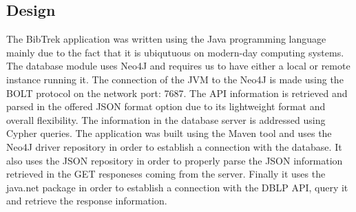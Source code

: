 \documentclass{article}
\begin{document}
\subsection{Design}
The BibTrek application was written using the Java programming language mainly due to the fact that it is ubiqutuous on modern-day computing systems. The database module uses Neo4J and requires us to have either a local or remote instance running it. The connection of the JVM to the Neo4J is made using the BOLT protocol on the network port: 7687. The API information is retrieved and parsed in the offered JSON format option due to its lightweight format and overall flexibility. The information in the database server is addressed using Cypher queries. The application was built using the Maven tool and uses the Neo4J driver repository in order to establish a connection with the database. It also uses the JSON repository in order to properly parse the JSON information retrieved in the GET responeses coming from the server. Finally it uses the java.net package in order to establish a connection with the DBLP API, query it and retrieve the response information.
\end{document}
